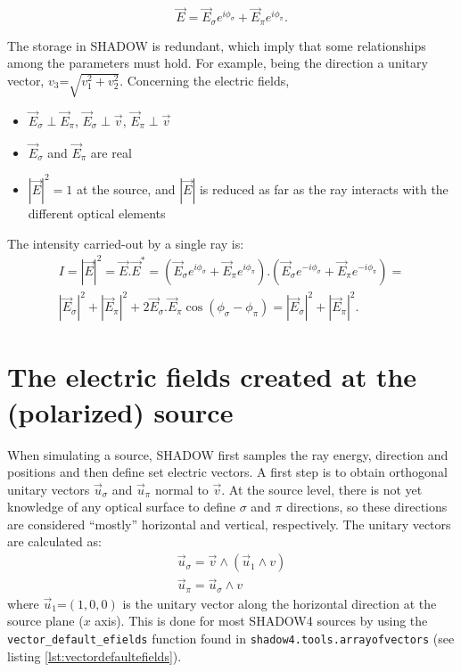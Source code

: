 \documentclass{iucr}
\begin{document}
\begin{equation}\label{eq:electricfieldray}
   \vec{E}= \vec{E}_\sigma e^{i \phi_\sigma} + \vec{E}_\pi e^{i \phi_\pi}.
\end{equation}

The storage in SHADOW is redundant, which imply that some relationships among the parameters must hold. For example, being the direction a unitary vector, $v_3\text{=}\sqrt{v_1^2+v_2^2}$. Concerning the electric fields,
\begin{itemize}
 \item $\vec{E}_\sigma \perp \vec{E}_\pi$, $\vec{E}_\sigma \perp \vec{v}$, $\vec{E}_\pi \perp \vec{v}$
 \item $\vec{E}_\sigma$ and $\vec{E}_\pi$ are real
 \item $|\vec{E}|^2=1$ at the source, and $|\vec{E}|$ is reduced as far as the ray interacts with the different 
 optical elements
\end{itemize}

The intensity carried-out by a single ray is:
\begin{eqnarray}
   I=|\vec{E}|^2 = \vec{E}.\vec{E}^* = (\vec{E}_\sigma e^{i \phi_\sigma} + \vec{E}_\pi e^{i\phi_\pi} ).
   (\vec{E}_\sigma e^{-i\phi_\sigma} + \vec{E}_\pi e^{-i\phi_\pi} ) =  \nonumber \\
   |\vec{E}_\sigma|^2 + |\vec{E}_\pi|^2 + 2 \vec{E}_\sigma.\vec{E}_\pi \cos(\phi_\sigma-\phi_\pi) =
   |\vec{E}_\sigma|^2 + |\vec{E}_\pi|^2.
\end{eqnarray}


\section{The electric fields created at the (polarized) source}
\label{sec:source}

When simulating a source, SHADOW first samples the ray energy, direction and positions and then define set electric vectors. 
A first step is to obtain orthogonal unitary vectors $\vec{u}_\sigma$ and $\vec{u}_\pi$ normal to $\vec{v}$. At the source 
level, there is not yet knowledge of any optical surface to define $\sigma$ and $\pi$ directions, so these directions 
are considered ``mostly'' horizontal and vertical, respectively. The unitary vectors are calculated as: 
\begin{eqnarray}
   \vec{u}_\sigma = \vec{v} \wedge (\vec{u}_1 \wedge{v}) \nonumber \\
   \vec{u}_\pi = \vec{u}_\sigma \wedge  {v}
\end{eqnarray}
where $\vec{u}_1\text{=}(1,0,0)$ is the unitary vector along the horizontal direction at the source plane ($x$ axis).
This is done for most SHADOW4 sources by using the {\tt vector\_default\_efields} function found in {\tt shadow4.tools.arrayofvectors} (see listing \ref{lst:vectordefaultefields}).
\end{document}
